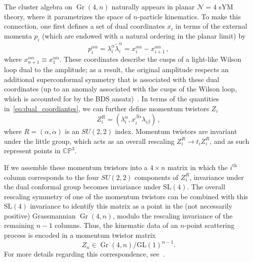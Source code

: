 \documentclass[11pt]{article}
\DeclareMathOperator{\Gr}{Gr}
\begin{document}

The cluster algebra on $\Gr(4,n)$ naturally appears in planar $\mathcal{N}=4$ sYM theory, where it parametrizes the space of $n$-particle kinematics. To make this connection, one first defines a set of dual coordinates $x_i$ in terms of the external momenta $p_i$ (which are endowed with a natural ordering in the planar limit) by
\begin{equation}
p_i^{\alpha \dot \alpha} = \lambda_i^\alpha \tilde \lambda_i^{\dot \alpha} = x_i^{\alpha \dot \alpha} - x_{i+1}^{\alpha \dot \alpha} \, , \label{eq:dual_coordiantes}
\end{equation}
where $x_{n+1}^{\alpha \dot \alpha} \equiv x_1^{\alpha \dot \alpha}$. These coordinates describe the cusps of a light-like Wilson loop dual to the amplitude; as a result, the original amplitude respects an additional superconformal symmetry that is associated with these dual coordinates (up to an anomaly associated with the cusps of the Wilson loop, which is accounted for by the BDS ansatz)~\cite{Bern:2005iz,Drummond:2007au,Bern:2008ap,Drummond:2008aq,Drummond:2006rz,Bern:2006ew,Bern:2007ct,Alday:2007hr,Drummond:2008vq}. In terms of the quantities in~\eqref{eq:dual_coordiantes}, we can further define momentum twistors $Z_i$
\begin{equation}
Z^R_i = (\lambda_i^\alpha, x_i^{\beta \dot \alpha} \lambda_{i \beta}) \, ,
\end{equation}
where $R = (\alpha, \dot \alpha)$ is an $SU(2,2)$ index. Momentum twistors are invariant under the little group, which acts as an overall rescaling $Z_i^R \rightarrow  t_i Z_i^R$, and as such represent points in $\mathbb{CP}^3$. 

If we assemble these momentum twistors into a $4 \times n$ matrix in which the $i^\text{th}$ column corresponds to the four $SU(2,2)$ components of $Z_i^R$, invariance under the dual conformal group becomes invariance under $\text{SL}(4)$. The overall rescaling symmetry of one of the momentum twistors can be combined with this $\text{SL}(4)$ invariance to identify this matrix as a point in the (not necessarily positive) Grassmannian $\Gr(4,n)$, modulo the rescaling invariance of the remaining $n-1$ columns. Thus, the kinematic data of an $n$-point scattering process is encoded in a momentum twistor matrix
\begin{equation}
Z_n \in \Gr(4,n)/\text{GL}(1)^{n-1}. \label{eq:gr4n_momentum_twistor}
\end{equation}
For more details regarding this correspondence, see~\cite{ArkaniHamed:2012nw,Golden:2013xva}. 
\end{document}
